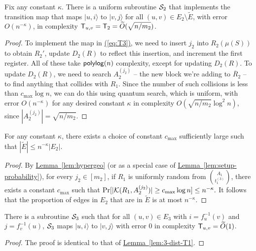 \documentclass{article}
\newcommand{\eq}[1]{\hyperref[eq:#1]{(\ref*{eq:#1})}}
\newcommand{\lem}[1]{\hyperref[lem:#1]{Lemma~\ref*{lem:#1}}}
\def\ket#1{{\lvert}#1\rangle}
\renewcommand{\>}{\rangle}
\newcommand{\<}{\langle}
\renewcommand{\(}{\left(}
\renewcommand{\)}{\right)}
\begin{document}
\begin{lemma}\label{lem:3-dist-T3}
Fix any constant $\kappa$. There is a uniform subroutine ${\cal S}_2$ that implements the transition map that maps $\ket{u,i}$ to $\ket{v,j}$ for all $(u,v)\in E_2\setminus\tilde{E}$, with error $O(n^{-\kappa})$, in complexity ${\sf T}_{u,v}={\sf T}_2=\widetilde{O}(\sqrt{n/m_2})$. 
\end{lemma}
\begin{proof}
To implement the map in \eq{T3}, we need to insert $j_2$ into $R_2(\mu(S))$ to obtain $R_2'$, update $D_2(R)$ to reflect this insertion, and increment the first register. All of these take ${\sf polylog}(n)$ complexity, except for updating $D_2(R)$. To update $D_2(R)$, we need to search $A_2^{(j_2)}$ -- the new block we're adding to $\overline{R}_2$ -- to find anything that collides with $R_1$. Since the number of such collisions is less than $c_{\max}\log n$, we can do this using quantum search, which is uniform, with error $O(n^{-\kappa})$ for any desired constant $\kappa$ in complexity 
$O(\sqrt{n/m_2}\log^2 n)$, since $|A_2^{(j_2)}|=\sqrt{n/m_2}$.
\end{proof}



\begin{lemma}\label{lem:tilde-E}
For any constant $\kappa$, there exists a choice of constant $c_{\max}$ sufficiently large such that 
$|\tilde{E}|\leq n^{-\kappa}|E_2|$. 
\end{lemma}
\begin{proof}
By \lem{hypergeo} (or as a special case of \lem{setup-probability}), for every $j_2\in [m_2]$, if $R_1$ is uniformly random from $\binom{A_1}{t_1^{(3)}}$, there exists a constant $c_{\max}$ such that 
$\Pr[|{\cal K}({R}_1,A_2^{(j_2)})|\geq c_{\max}\log n]\leq n^{-\kappa}.$
It follows that the proportion of edges in $E_2$ that are in $\tilde{E}$ is at most $n^{-\kappa}$.
\end{proof}
\begin{lemma}\label{lem:3-dist-T4}
There is a subroutine ${\cal S}_3$ such that for all $(u,v)\in E_3$ with $i=f_u^{-1}(v)$ and $j=f_v^{-1}(u)$, ${\cal S}_3$ maps $\ket{u,i}$ to $\ket{v,j}$ with error 0 in complexity ${\sf T}_{u,v}=\widetilde{O}(1)$.
\end{lemma}
\begin{proof}
The proof is identical to that of \lem{3-dist-T1}.
\end{proof}
\end{document}
